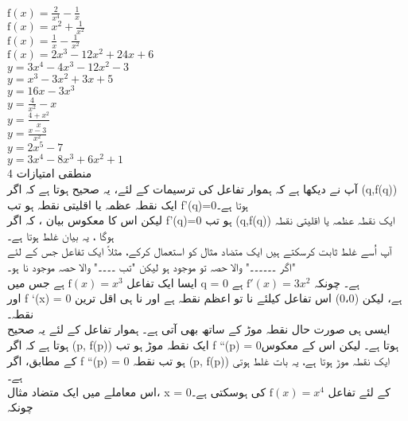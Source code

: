 \( \text{f}(x) = \frac{2}{x^4} - \frac{1}{x} \)\\
\( \text{f}(x) = x^2 + \frac{1}{x^2} \)\\
\( \text{f}(x) = \frac{1}{x} - \frac{1}{x^2} \)\\
\( \text{f}(x) = 2x^3 - 12x^2 + 24x + 6 \)\\
\( y = 3x^4 - 4x^3 - 12x^2 - 3 \)\\
\( y = x^3 - 3x^2 + 3x + 5 \)\\
\( y = 16x - 3x^3 \)\\
\( y = \frac{4}{x^2} - x \)\\
\( y = \frac{4 + x^2}{x} \)\\
\( y = \frac{x - 3}{x^2} \)\\
\( y = 2x^5 - 7 \)\\
\( y = 3x^4 - 8x^3 + 6x^2 + 1 \)\\
			
4 منطقی امتیازات\\
آپ نے دیکھا ہے کہ ہموار تفاعل کی ترسیمات کے لئے، یہ صحیح ہوتا ہے کہ
اگر (q,f(q)) ایک نقطہ عظمہ یا اقلیتی نقطہ ہو تب f'(q)=0ہوتا ہے۔\\
لیکن اس کا معکوس بیان ، کہ
اگر f'(q)=0 ہو تب (q,f(q))   ایک نقطہ عظمہ یا اقلیتی نقطہ ہوگا ،   یہ بیان غلط ہوتا ہے۔ \\
آپ اُسے غلط ثابت کرسکتے ہیں ایک متضاد مثال کو استعمال کرکے، مثلاً ایک تفاعل جس کے لئے "اگر ۔۔۔۔۔۔" والا حصہ تو موجود ہو لیکن "تب ۔۔۔۔" والا حصہ موجود نا ہو۔ \\
	ایسا ایک تفاعل
\( \text{f}(x) = x^{3} \)
	  ہے جس میں q = 0 ہے۔ چونکہ
\( \text{f}'(x) = 3x^{2 }\)
	    ہے\\
اور f `(x) = 0 ہے، لیکن (0،0) اس تفاعل کیلئے نا تو اعظم نقطہ ہے اور نا ہی اقل ترین نقطہ۔ \\
ایسی ہی صورت حال نقطہ موڑ کے ساتھ بھی آتی ہے۔ ہموار تفاعل کے لئے یہ صحیح ہوتا ہے کہ
	اگر (p, f(p)) ایک نقطہ موڑ ہو تب f ``(p) = 0ہوتا ہے۔ لیکن اس کے معکوس کے مطابق،
اگر f ``(p) = 0 ہو تب نقطہ (p, f(p))  ایک نقطہ موڑ ہوتا ہے، یہ بات غلط ہوتی ہے۔ \\
	اس معاملے میں ایک متضاد مثال، x = 0کے لئے تفاعل
	\( \text{f}(x) = x^{4} \)
	 کی ہوسکتی ہے۔ چونکہ 


